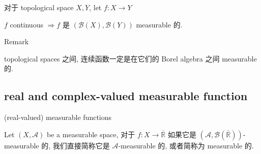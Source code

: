 \documentclass{qlnotes-export}
\begin{document}
\begin{proposition}\label{prop-04-measurable-functions-and-integration-on-l-mu-proposition-002}

对于 topological space \(X,Y\), let \(f:X\rightarrow Y\)

\(f\) continuous \(\Longrightarrow\)\(f\) 是 \((\mathcal{B}(X),\mathcal{B}(Y))\) measurable 的.

\end{proposition}

\begin{qlremark}{Remark}

topological spaces 之间, 连续函数一定是在它们的 Borel algebra 之间 measurable 的.

\end{qlremark}

\subsection{real and complex-valued measurable function}\label{real-and-complex-valued-measurable-function}

\begin{definition}{(real-valued) measurable functions}\label{def-04-measurable-functions-and-integration-on-l-mu-real-valued-measurable-functions}

Let \((X,\mathcal{A})\) be a measurable space, 对于 \(f:X\rightarrow\bar{\mathbb{R}}\) 如果它是 \((\mathcal{A},\mathcal{B}(\bar{\mathbb{R}}))\)-measurable 的, 我们直接简称它是 \(\mathcal{A}\)-measurable 的, 或者简称为 measurable 的.

\end{definition}
\end{document}
